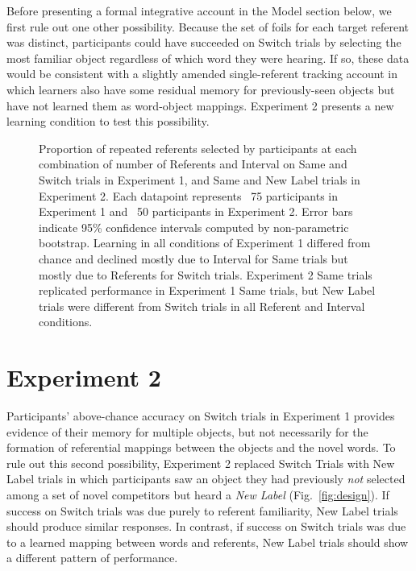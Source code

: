 \documentclass{pnastwo}
\begin{document}
\begin{article}
Before presenting a formal integrative account in the Model section below, we first rule out one other possibility. Because the set of foils for each target referent was distinct, participants could have succeeded on Switch trials by selecting the most familiar object regardless of which word they were hearing. If so, these data would be consistent with a slightly amended single-referent tracking account in which learners also have some residual memory for previously-seen objects but have not learned them as word-object mappings. Experiment 2 presents a new learning condition to test this possibility.


 \begin{figure}
	\caption{\label{fig:exp1_2_data} Proportion of repeated referents selected by participants at each combination of number of Referents and Interval on Same and Switch trials in Experiment 1, and Same and New Label trials in Experiment 2. Each datapoint represents ~75 participants in Experiment 1 and ~50 participants in Experiment 2. Error bars indicate 95\% confidence intervals computed by non-parametric bootstrap. Learning in all conditions of Experiment 1 differed from chance and declined mostly due to Interval for Same trials but mostly due to Referents for Switch trials. Experiment 2 Same trials replicated performance in Experiment 1 Same trials, but New Label trials were different from Switch trials in all Referent and Interval conditions.} 
\end{figure}
\section{Experiment 2}

Participants' above-chance accuracy on Switch trials in Experiment 1 provides evidence of their memory for multiple objects, but not necessarily for the formation of referential mappings between the objects and the novel words. To rule out this second possibility, Experiment 2 replaced Switch Trials with New Label trials in which participants saw an object they had previously \emph{not} selected among a set of novel competitors but heard a \emph{New Label} (Fig.~\ref{fig:design}). If success on Switch trials was due purely to referent familiarity, New Label trials should produce similar responses. In contrast, if success on Switch trials was due to a learned mapping between words and referents, New Label trials should show a different pattern of performance.


\end{article}
\end{document}
